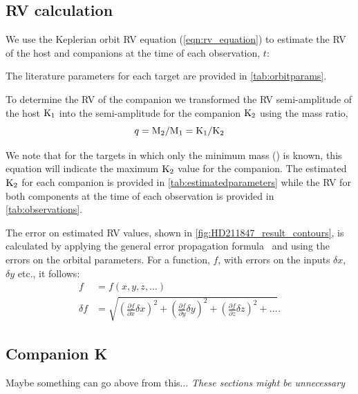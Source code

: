 

\subsection{{RV} calculation}
We use the Keplerian orbit {RV} equation (\cref{eqn:rv_equation}) to estimate the {RV} of the host and companions at the time of each observation, \(t\):

The literature parameters for each target are provided in \cref{tab:orbitparams}.


To determine the {RV} of the companion we transformed the {RV} semi-amplitude of the host \(\textrm{K}_{1}\) into the semi-amplitude for the companion \(\textrm{K}_{2}\) using the mass ratio,
\begin{equation}
\label{eqn:mass_ratio}
q = \textrm{M}_{2} / \textrm{M}_{1} = \textrm{K}_{1} / \textrm{K}_{2}
\end{equation}

We note that for the targets in which only the minimum mass (\mtwosini) is known, this equation will indicate the maximum \(\textrm{K}_{2}\) value for the companion.
The estimated \(\textrm{K}_{2}\) for each companion is provided in \cref{tab:estimatedparameters} while the {RV} for both components at the time of each observation is provided in \cref{tab:observations}.


The error on estimated {RV} values, shown in \cref{fig:HD211847_result_contours}, is calculated by applying the general error propagation formula~\citep{ku_notes_1966} and using the errors on the orbital parameters.
For a function, \(f\), with errors on the inputs \(\delta x\), \(\delta y\) etc., it follows:
\begin{align}
f &= f(x, y, z, \ldots)\\
\delta f &= \sqrt{{\left( \frac{\partial f}{\partial x} \delta x\right)}^2 + {\left(\frac{\partial f}{\partial y} \delta y\right)}^2 + {\left(\frac{\partial f}{\partial z} \delta z\right)}^2 + \ldots}.
\end{align}




\subsection{Companion K}  Maybe something can go above from this...
\label{sec:companion_RV}
\emph{These sections might be unnecessary}\\

